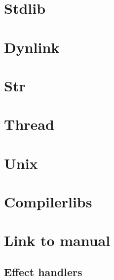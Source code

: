 \documentclass{book}
\newcommand{\docitem}[2]{}
\newcommand{\docitem}[2]{}
\begin{document}
\chapter{Stdlib}
\docitem{libref}{Stdlib.tex}

\docitem{libref}{Ocaml_operators.tex}
\chapter{Dynlink}
\docitem{libref}{Dynlink.tex}
\chapter{Str}
\docitem{libref}{Str.tex}
\chapter{Thread}
\docitem{libref}{Event.tex}
\docitem{libref}{Thread.tex}
\chapter{Unix}
\docitem{libref}{UnixLabels.tex}
\docitem{libref}{Unix.tex}
\chapter{Compilerlibs}
\docitem{compilerlibref}{Compiler_libs.tex}


\chapter{Link to manual}

\section{Effect handlers}\label{s:effect-handlers}
\end{document}
